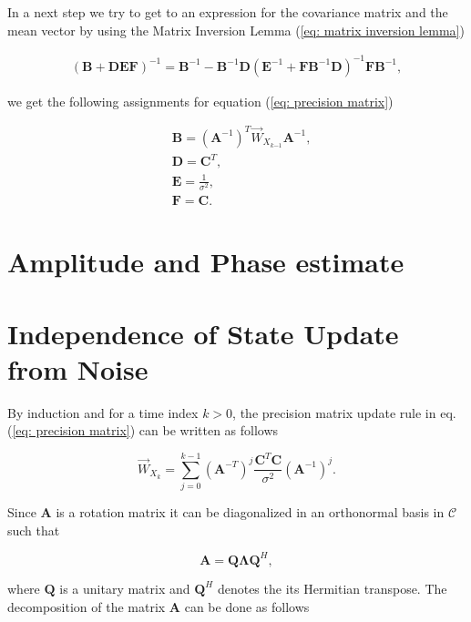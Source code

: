 \documentclass[11pt,a4paper,twoside]{report}
\newcommand{\messF}[3]{\vec{#1}_{{#2}_{k{#3}}}}
\newcommand{\mat}[1]{\mathbf{#1}}
\begin{document}
In a next step we try to get to an expression for the covariance matrix and the mean vector by using the Matrix Inversion Lemma (\ref{eq: matrix inversion lemma})
 
\begin{align}
	\label{eq: matrix inversion lemma}
	\left(\mat{B} + \mat{DEF}\right)^{-1} = \mat{B}^{-1} - \mat{B}^{-1}\mat{D}\left(\mat{E}^{-1} + \mat{F}\mat{B}^{-1}\mat{D}\right)^{-1}\mat{F}\mat{B}^{-1},
\end{align}

we get the following assignments for equation (\ref{eq: precision matrix})

\begin{align}
	\label{eq: assignments MIL}
	& \mat{B} = \left(\mat{A}^{-1}\right)^T\messF{W}{X}{-1}\mat{A}^{-1}, \\
	& \mat{D} = \mat{C}^T, \\
	& \mat{E} = \frac{1}{\sigma^2}, \\
	& \mat{F} = \mat{C}.
\end{align}


\chapter*{Amplitude and Phase estimate}



\chapter*{Independence of State Update from Noise}
By induction and for a time index $k>0$, the precision matrix update rule in eq. (\ref{eq: precision matrix}) can be written as follows

\begin{equation}
	\label{eq: update rule}
	\messF{W}{X}{} = \sum_{j=0}^{k-1}\left(\mat{A}^{-T}\right)^j\frac{\mat{C}^T\mat{C}}{\sigma^2}\left(\mat{A}^{-1}\right)^{j}.
\end{equation}

Since $\mat{A}$ is a rotation matrix it can be diagonalized in an orthonormal basis in $\mathcal{C}$ such that

\begin{equation}
	\mat{A} = \mat{Q\Lambda}\mat{Q}^H,
\end{equation}

where $\mat{Q}$ is a unitary matrix and $\mat{Q}^H$ denotes the its Hermitian transpose. The decomposition of the matrix $\mat{A}$ can be done as follows
\end{document}
